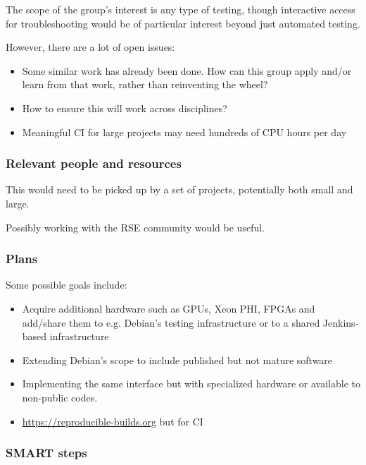 The scope of the group's interest is any type of testing, though interactive access for troubleshooting would be of particular interest beyond just automated testing.

However, there are a lot of open issues:

\begin{itemize}
\item Some similar work has already been done.  How can this group apply and/or learn from that work, rather than reinventing the wheel?
\item How to ensure this will work across disciplines?
\item Meaningful CI for large projects may need hundreds of CPU hours per day
\end{itemize}


\subsubsection{Relevant people and resources}

This would need to be picked up by a set of projects, potentially both small and large.

Possibly working with the RSE community would be useful.

\subsubsection{Plans}

Some possible goals include:
\begin{itemize}
\item Acquire additional hardware such as GPUs, Xeon PHI, FPGAs and add/share them to e.g. Debian's testing infrastructure or to a shared Jenkins-based infrastructure
\item Extending Debian's scope to include published but not mature software
\item Implementing the same interface but with specialized hardware or available to non-public codes.
\item \url{https://reproducible-builds.org} but for CI 
\end{itemize}

\subsubsection{SMART steps}


